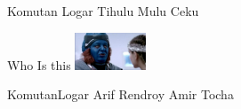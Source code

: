 \documentclass{exam}
\begin{document}
\begin{questions}
\begin{oneparchoices}
\choice Komutan Logar
\CorrectChoice Tihulu
\choice Mulu
\choice Ceku
\end{oneparchoices}
\question Who Is this\newline
\includegraphics[height=3em]{rendroy2.jpg} \newline
\begin{oneparchoices}
\choice KomutanLogar
\choice Arif
\CorrectChoice Rendroy
\choice Amir Tocha
\end{oneparchoices}
\end{questions}
\end{document}

